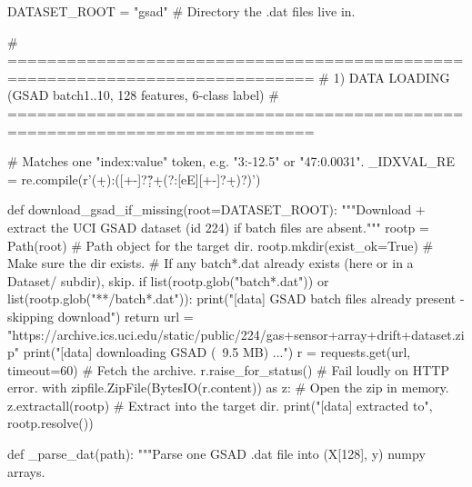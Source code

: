 DATASET_ROOT = "gsad"                               # Directory the .dat files live in.

# =============================================================================
# 1) DATA LOADING  (GSAD batch1..10, 128 features, 6-class label)
# =============================================================================

# Matches one "index:value" token, e.g. "3:-12.5" or "47:0.0031".
_IDXVAL_RE = re.compile(r'(\d+):([+-]?\d*\.?\d+(?:[eE][+-]?\d+)?)')

def download_gsad_if_missing(root=DATASET_ROOT):
    """Download + extract the UCI GSAD dataset (id 224) if batch files are absent."""
    rootp = Path(root)                              # Path object for the target dir.
    rootp.mkdir(exist_ok=True)                      # Make sure the dir exists.
    # If any batch*.dat already exists (here or in a Dataset/ subdir), skip.
    if list(rootp.glob("batch*.dat")) or list(rootp.glob("**/batch*.dat")):
        print("[data] GSAD batch files already present - skipping download")
        return
    url = "https://archive.ics.uci.edu/static/public/224/gas+sensor+array+drift+dataset.zip"
    print("[data] downloading GSAD (~9.5 MB) ...")
    r = requests.get(url, timeout=60)               # Fetch the archive.
    r.raise_for_status()                            # Fail loudly on HTTP error.
    with zipfile.ZipFile(BytesIO(r.content)) as z:  # Open the zip in memory.
        z.extractall(rootp)                         # Extract into the target dir.
    print("[data] extracted to", rootp.resolve())

def _parse_dat(path):
    """Parse one GSAD .dat file into (X[128], y) numpy arrays.


